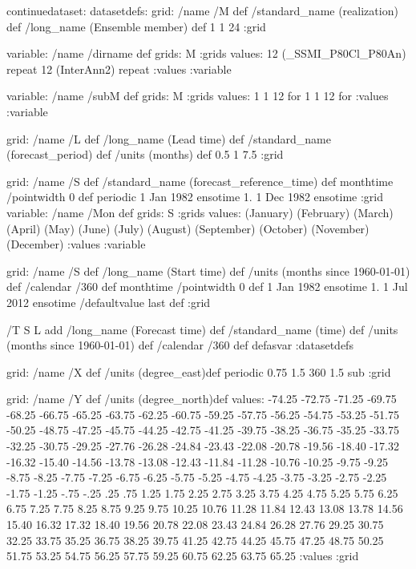 \begin{ingrid}

continuedataset:
datasetdefs:
grid:
/name /M def
/standard_name (realization) def
/long_name (Ensemble member) def
1 1 24
:grid

variable: 
/name /dirname def
grids: M :grids
values: 12 (_SSMI_P80Cl_P80An) repeat 12 (InterAnn2) repeat :values
:variable


variable:
/name /subM def
grids: M :grids
values: 1 1 12 {}
for 1 1 12 {}
for :values
:variable 

grid:
/name /L def
/long_name (Lead time) def
/standard_name (forecast_period) def
/units (months) def
0.5 1 7.5
:grid

grid:
/name /S def
/standard_name (forecast_reference_time) def
monthtime
/pointwidth 0 def
periodic
1 Jan 1982 ensotime
1.
1 Dec 1982 ensotime
:grid
variable:
/name /Mon def
grids: S :grids
values:
(January)
(February)
(March)
(April)
(May)
(June)
(July)
(August)
(September)
(October)
(November)
(December)
:values
:variable

grid:
/name /S def
/long_name (Start time) def
/units (months since 1960-01-01) def
/calendar /360 def
monthtime
/pointwidth 0 def 
1 Jan 1982 ensotime
1.
1 Jul 2012 ensotime
/defaultvalue {last} def
:grid

/T { 
S L add
/long_name (Forecast time) def
/standard_name (time) def
/units (months since 1960-01-01) def
/calendar /360 def
 }defasvar
:datasetdefs

grid:
/name /X def
/units (degree_east)def
 periodic
 0.75 1.5 360 1.5 sub
:grid

grid:
/name /Y def
/units (degree_north)def
values:
-74.25 -72.75 -71.25 -69.75 -68.25 -66.75 -65.25 
-63.75 -62.25 -60.75 -59.25 -57.75 -56.25 -54.75 -53.25 -51.75 
-50.25 -48.75 -47.25 -45.75 -44.25 -42.75 -41.25 -39.75 -38.25 
-36.75 -35.25 -33.75 -32.25 -30.75 -29.25 -27.76 -26.28 
-24.84 -23.43 -22.08 -20.78 -19.56 -18.40 -17.32 
-16.32 -15.40 -14.56 -13.78 -13.08 -12.43 -11.84 -11.28 
-10.76 -10.25 -9.75 -9.25  -8.75 -8.25 -7.75 
-7.25 -6.75 -6.25 -5.75 -5.25 -4.75 -4.25 -3.75 
-3.25 -2.75 -2.25 -1.75 -1.25 -.75 -.25 .25 
.75 1.25 1.75 2.25 2.75 3.25 3.75 4.25 4.75 
5.25 5.75  6.25 6.75 7.25 7.75 8.25 8.75 9.25 9.75 
10.25 10.76 11.28 11.84 12.43 13.08 13.78 14.56 
15.40 16.32 17.32 18.40 19.56 20.78 22.08 
23.43 24.84 26.28 27.76 29.25 30.75 32.25 33.75 35.25 
36.75 38.25 39.75 41.25 42.75 44.25 45.75 47.25 48.75 50.25 51.75 
53.25 54.75 56.25 57.75 59.25 60.75 62.25 63.75 65.25
:values
:grid


\end{ingrid}
